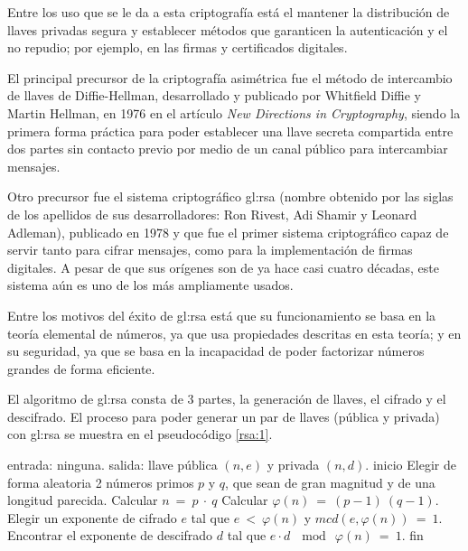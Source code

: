 Entre los uso que se le da a esta criptografía está el mantener la
distribución de llaves privadas segura y establecer métodos que garanticen
la autenticación y el no repudio; por ejemplo, en las firmas y
certificados digitales.

El principal precursor de la criptografía asimétrica fue el método de
intercambio de llaves de Diffie-Hellman, desarrollado y publicado por
Whitfield Diffie y Martin Hellman, en 1976 en el artículo \textit{New
Directions in Cryptography}\cite{diffie_hellman}, siendo la primera
forma práctica para poder establecer una llave secreta compartida
entre dos partes sin contacto previo por medio de un canal público
para intercambiar mensajes.

Otro precursor fue el sistema criptográfico \gls{gl:rsa} (nombre
obtenido por las siglas de los apellidos de sus desarrolladores: Ron Rivest,
Adi Shamir y Leonard Adleman), publicado en 1978\cite{rsa_publicacion} y que
fue el primer sistema criptográfico capaz de servir tanto para cifrar
mensajes, como para la implementación de firmas digitales. A pesar de que sus
orígenes son de ya hace casi cuatro décadas, este sistema aún es uno de los
más ampliamente usados.

Entre los motivos del éxito de \gls{gl:rsa} está que su funcionamiento
se basa en la teoría elemental de números, ya que usa propiedades descritas
en esta teoría; y en su seguridad, ya que se basa en la incapacidad de poder
factorizar números grandes de forma eficiente.

El algoritmo de \gls{gl:rsa} consta de 3 partes, la generación de llaves,
el cifrado y el descifrado. El proceso para poder generar un par de llaves
(pública y privada) con \gls{gl:rsa} se muestra en el pseudocódigo
\ref{rsa:1}.

\begin{pseudocodigo}[caption={Proceso de generación de llaves de
  \gls{gl:rsa}.}, label={rsa:1}]
  entrada: ninguna.
  salida:  llave pública $(n,e)$ y privada $(n,d)$.
  inicio
    Elegir de forma aleatoria 2 números primos $p$ y $q$, que sean de gran
    magnitud y de una longitud parecida.
    Calcular $n\: =\: p \:\cdot \:q$
    Calcular $\varphi(n) \:= \:(p-1) \:(q-1)$.
    Elegir un exponente de cifrado $e$ tal que $e \:< \:\varphi(n)$ y $mcd(e,\varphi(n)) \:= \:1$.
    Encontrar el exponente de descifrado $d$ tal que $e \cdot d \:\mod \:\varphi(n) \:= \:1$.
  fin
\end{pseudocodigo}

